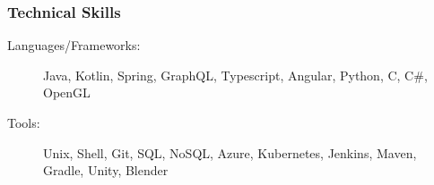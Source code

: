 \documentclass{article}
\begin{document}

\subsubsection*{Technical Skills}
    \begin{description}    
        \item[Languages/Frameworks:] 
            Java, 
            Kotlin,
            Spring,
            GraphQL,
            Typescript,
            Angular,
            Python,
            C,
            C\#,
            OpenGL

            \vspace{0.5em}

        \item[Tools:] 
            Unix,
            Shell,
            Git,
            SQL,
            NoSQL,
            Azure,
            Kubernetes,
            Jenkins,
            Maven,
            Gradle,
            Unity,
            Blender
    \end{description}
\end{document}

